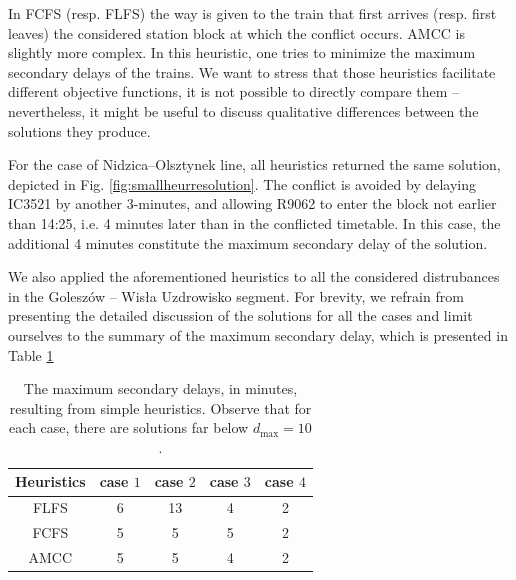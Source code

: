 In FCFS (resp. FLFS) the way is given to the train that first arrives (resp. first leaves) the
considered station block at which the conflict occurs. AMCC is slightly more complex. In this
heuristic, one tries to minimize the maximum secondary delays of the trains. We want to stress
that those heuristics facilitate different objective functions, it is not possible to directly
compare them -- nevertheless, it might be useful to discuss qualitative differences between
the solutions they produce.

For the case of Nidzica--Olsztynek line, all heuristics returned the same solution, depicted in
Fig. \ref{fig:smallheurresolution}. The conflict is avoided by delaying IC3521 by another
3-minutes, and allowing R9062 to enter the block not earlier than 14:25, i.e. 4 minutes later
than in the conflicted timetable. In this case, the additional 4 minutes constitute the maximum
secondary delay of the solution.

We also applied the aforementioned heuristics to all the considered distrubances in the
Goleszów -- Wisła Uzdrowisko segment. For brevity, we refrain from presenting the detailed
discussion of the solutions for all the cases and limit ourselves to the summary of the maximum
secondary delay, which is presented in Table \ref{tab:simple}

\begin{table}
\centering
\begin{tabular}{ccccc}
Heuristics & case $1$ & case $2$ & case $3$ & case $4$  \\
\hline
FLFS & 6 & 13 & 4 & 2 \\
\hline
FCFS & 5 & 5 & 5 & 2 \\
\hline
AMCC & 5 & 5 & 4 & 2 \\
\hline
\end{tabular}
\caption{The maximum secondary delays, in minutes, resulting from simple heuristics.
  Observe that for each case, there are solutions far below $d_{\text{max}}
= 10$.}
\label{tab:simple}
\end{table}

